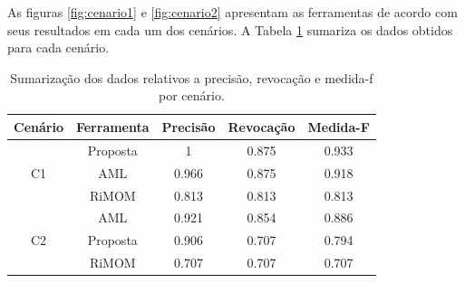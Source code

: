As figuras \ref{fig:cenario1} e \ref{fig:cenario2} apresentam as ferramentas de acordo com seus resultados em cada um dos cenários. A Tabela \ref{tab:resultados} sumariza os dados obtidos para cada cenário.

\begin{table}[h]
	\centering
	\caption{Sumarização dos dados relativos a precisão, revocação e medida-f por cenário.}
	\label{tab:resultados}
	\begin{tabular}{|c|c|c|c|c|}
		\hline
		      Cenário       & Ferramenta & Precisão & Revocação & Medida-F \\ \hline
		\multirow{3}{*}{C1} &  Proposta  &    1     &   0.875   &  0.933   \\ \cline{2-5}
		                    &    AML     &  0.966   &   0.875   &  0.918   \\ \cline{2-5}
		                    &   RiMOM    &  0.813   &   0.813   &  0.813   \\ \hline
		\multirow{3}{*}{C2} &    AML     &  0.921   &   0.854   &  0.886   \\ \cline{2-5}
		                    &  Proposta  &  0.906   &   0.707   &  0.794   \\ \cline{2-5}
		                    &   RiMOM    &  0.707   &   0.707   &  0.707   \\ \hline
	\end{tabular}
\end{table}

